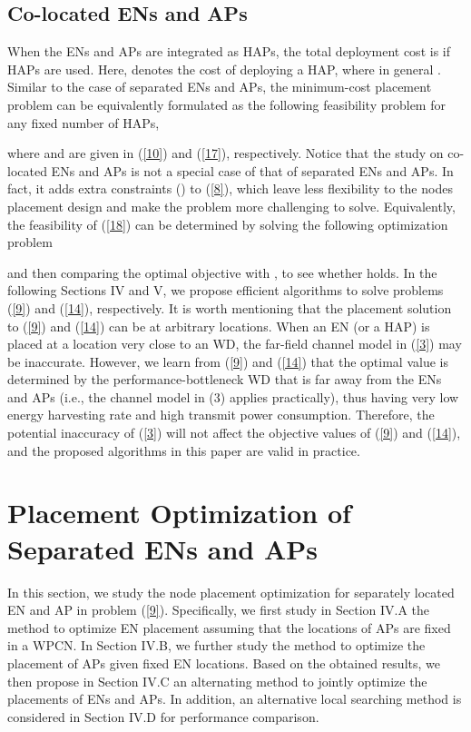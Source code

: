 \documentclass[journal, draftcls, one column, 12pt]{IEEEtran}
\begin{document}
\subsection{Co-located ENs and APs}
When the ENs and APs are integrated as HAPs, the total deployment cost is  if  HAPs are used. Here,  denotes the cost of deploying a HAP, where in general . Similar to the case of separated ENs and APs, the minimum-cost placement problem can be equivalently formulated as the following feasibility problem for any fixed number of  HAPs,

where  and  are given in (\ref{10}) and (\ref{17}), respectively. Notice that the study on co-located ENs and APs is not a special case of that of separated ENs and APs. In fact, it adds extra constraints () to (\ref{8}), which leave less flexibility to the nodes placement design and make the problem more challenging to solve. Equivalently, the feasibility of (\ref{18}) can be determined by solving the following optimization problem

and then comparing the optimal objective  with , to see whether  holds. In the following Sections IV and V, we propose efficient algorithms to solve problems (\ref{9}) and (\ref{14}), respectively. It is worth mentioning that the placement solution to (\ref{9}) and (\ref{14}) can be at arbitrary locations. When an EN (or a HAP) is placed at a location very close to an WD, the far-field channel model in (\ref{3}) may be inaccurate. However, we learn from (\ref{9}) and (\ref{14}) that the optimal value  is determined by the performance-bottleneck WD that is far away from the ENs and APs (i.e., the channel model in (3) applies practically), thus having very low energy harvesting rate and high transmit power consumption. Therefore, the potential inaccuracy of (\ref{3}) will not affect the objective values of (\ref{9}) and (\ref{14}), and the proposed algorithms in this paper are valid in practice.

\section{Placement Optimization of Separated ENs and APs}
In this section, we study the node placement optimization for separately located EN and AP in problem (\ref{9}). Specifically, we first study in Section IV.A the method to optimize EN placement assuming that the locations of APs are fixed in a WPCN. In Section IV.B, we further study the method to optimize the placement of APs given fixed EN locations. Based on the obtained results, we then propose in Section IV.C an alternating method to jointly optimize the placements of ENs and APs. In addition, an alternative local searching method is considered in Section IV.D for performance comparison.
\end{document}
